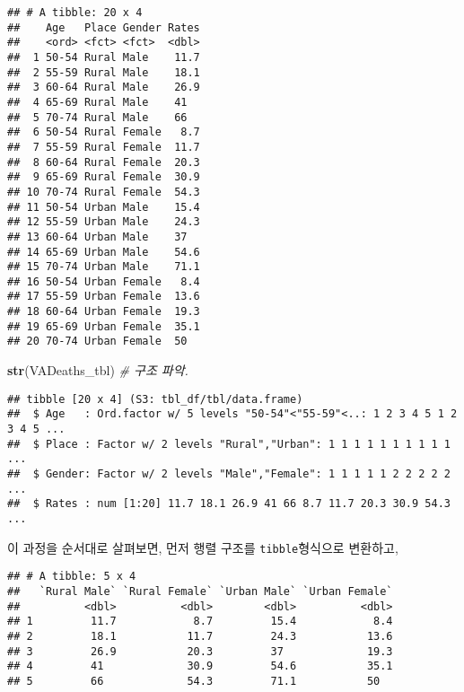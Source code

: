 \documentclass[
]{article}
\newenvironment{Shaded}{\begin{snugshade}}{\end{snugshade}}
\newcommand{\CommentTok}[1]{\textcolor[rgb]{0.56,0.35,0.01}{\textit{#1}}}
\newcommand{\KeywordTok}[1]{\textcolor[rgb]{0.13,0.29,0.53}{\textbf{#1}}}
\newcommand{\NormalTok}[1]{#1}
\newcommand{\OperatorTok}[1]{\textcolor[rgb]{0.81,0.36,0.00}{\textbf{#1}}}
\newcommand{\StringTok}[1]{\textcolor[rgb]{0.31,0.60,0.02}{#1}}
\begin{document}
\begin{verbatim}
## # A tibble: 20 x 4
##    Age   Place Gender Rates
##    <ord> <fct> <fct>  <dbl>
##  1 50-54 Rural Male    11.7
##  2 55-59 Rural Male    18.1
##  3 60-64 Rural Male    26.9
##  4 65-69 Rural Male    41  
##  5 70-74 Rural Male    66  
##  6 50-54 Rural Female   8.7
##  7 55-59 Rural Female  11.7
##  8 60-64 Rural Female  20.3
##  9 65-69 Rural Female  30.9
## 10 70-74 Rural Female  54.3
## 11 50-54 Urban Male    15.4
## 12 55-59 Urban Male    24.3
## 13 60-64 Urban Male    37  
## 14 65-69 Urban Male    54.6
## 15 70-74 Urban Male    71.1
## 16 50-54 Urban Female   8.4
## 17 55-59 Urban Female  13.6
## 18 60-64 Urban Female  19.3
## 19 65-69 Urban Female  35.1
## 20 70-74 Urban Female  50
\end{verbatim}

\begin{Shaded}
\begin{Highlighting}[]
\KeywordTok{str}\NormalTok{(VADeaths_tbl) }\CommentTok{# 구조 파악.}
\end{Highlighting}
\end{Shaded}

\begin{verbatim}
## tibble [20 x 4] (S3: tbl_df/tbl/data.frame)
##  $ Age   : Ord.factor w/ 5 levels "50-54"<"55-59"<..: 1 2 3 4 5 1 2 3 4 5 ...
##  $ Place : Factor w/ 2 levels "Rural","Urban": 1 1 1 1 1 1 1 1 1 1 ...
##  $ Gender: Factor w/ 2 levels "Male","Female": 1 1 1 1 1 2 2 2 2 2 ...
##  $ Rates : num [1:20] 11.7 18.1 26.9 41 66 8.7 11.7 20.3 30.9 54.3 ...
\end{verbatim}

이 과정을 순서대로 살펴보면, 먼저 행렬 구조를 \texttt{tibble}형식으로
변환하고,

\begin{Shaded}
\end{Shaded}

\begin{verbatim}
## # A tibble: 5 x 4
##   `Rural Male` `Rural Female` `Urban Male` `Urban Female`
##          <dbl>          <dbl>        <dbl>          <dbl>
## 1         11.7            8.7         15.4            8.4
## 2         18.1           11.7         24.3           13.6
## 3         26.9           20.3         37             19.3
## 4         41             30.9         54.6           35.1
## 5         66             54.3         71.1           50
\end{verbatim}
\end{document}
